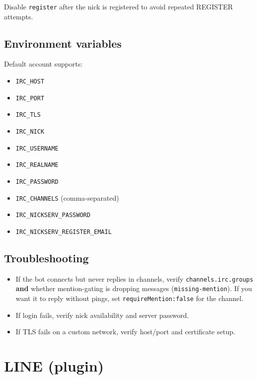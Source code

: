 Disable \texttt{register} after the nick is registered to avoid repeated REGISTER attempts.

\subsection{Environment variables}


Default account supports:

\begin{itemize}
  \item \texttt{IRC\_HOST}
  \item \texttt{IRC\_PORT}
  \item \texttt{IRC\_TLS}
  \item \texttt{IRC\_NICK}
  \item \texttt{IRC\_USERNAME}
  \item \texttt{IRC\_REALNAME}
  \item \texttt{IRC\_PASSWORD}
  \item \texttt{IRC\_CHANNELS} (comma-separated)
  \item \texttt{IRC\_NICKSERV\_PASSWORD}
  \item \texttt{IRC\_NICKSERV\_REGISTER\_EMAIL}
\end{itemize}


\subsection{Troubleshooting}


\begin{itemize}
  \item If the bot connects but never replies in channels, verify \texttt{channels.irc.groups} \textbf{and} whether mention-gating is dropping messages (\texttt{missing-mention}). If you want it to reply without pings, set \texttt{requireMention:false} for the channel.
  \item If login fails, verify nick availability and server password.
  \item If TLS fails on a custom network, verify host/port and certificate setup.
\end{itemize}



\clearpage

\section{LINE (plugin)}


